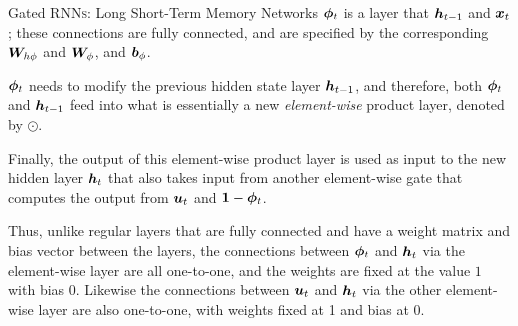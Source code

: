 %
%
%
\begin{frame}{Gated RNN\textsc{s}: Long Short-Term Memory Networks}
${\bm \phi}_t$ is a layer that
${\boldsymbol h}_{t-1}$ and 
${\boldsymbol x}_t$;
these connections are fully connected, and are specified by the
corresponding  ${\boldsymbol W}_{h\phi}$ and ${\boldsymbol W}_{\phi}$, 
and  ${\boldsymbol b}_\phi$. %

\medskip


${\bm \phi}_t$ needs to modify the previous hidden state layer ${\boldsymbol h}_{t-1}$, and
therefore, both ${\bm \phi}_t$ and ${\boldsymbol h}_{t-1}$ feed into what is essentially a new {\em
element-wise} product layer, denoted by $\odot$.%

\medskip


Finally, the output of this element-wise
product layer is used as input to the new hidden layer ${\boldsymbol h}_t$ that
also takes input from another element-wise gate that computes the output
from ${\boldsymbol u}_t$ and  $\mathbf{1}-{\bm \phi}_t$.


\medskip

Thus, unlike regular layers
that are fully connected and have a weight matrix and bias vector
between the layers, the connections between ${\bm \phi}_t$ and ${\boldsymbol h}_t$ via
the element-wise layer are all
one-to-one, and the weights are fixed at the value $1$ with bias
$0$. Likewise the connections between ${\boldsymbol u}_t$ and ${\boldsymbol h}_{t}$ via the
other element-wise layer are also one-to-one, with weights fixed at 1 and
bias at 0.
\end{frame}
%
